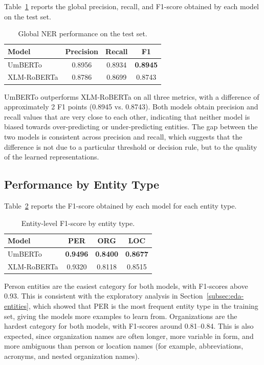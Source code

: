 Table~\ref{tab:eval-global} reports the global precision, recall, and F1-score obtained by each model on the test set.

\begin{table}[H]
    \centering
    \caption{Global NER performance on the test set.}
    \label{tab:eval-global}
    \begin{tabular}{lccc}
        \hline
        \textbf{Model} & \textbf{Precision} & \textbf{Recall} & \textbf{F1} \\
        \hline
        UmBERTo & 0.8956 & 0.8934 & \textbf{0.8945} \\
        XLM-RoBERTa & 0.8786 & 0.8699 & 0.8743 \\
        \hline
    \end{tabular}
\end{table}

UmBERTo outperforms XLM-RoBERTa on all three metrics, with a difference of approximately 2 F1 points (0.8945 vs. 0.8743). Both models obtain precision and recall values that are very close to each other, indicating that neither model is biased towards over-predicting or under-predicting entities. The gap between the two models is consistent across precision and recall, which suggests that the difference is not due to a particular threshold or decision rule, but to the quality of the learned representations.

\subsection{Performance by Entity Type}
\label{subsec:eval-entity}

Table~\ref{tab:eval-entity} reports the F1-score obtained by each model for each entity type.

\begin{table}[H]
    \centering
    \caption{Entity-level F1-score by entity type.}
    \label{tab:eval-entity}
    \begin{tabular}{lccc}
        \hline
        \textbf{Model} & \textbf{PER} & \textbf{ORG} & \textbf{LOC} \\
        \hline
        UmBERTo & \textbf{0.9496} & \textbf{0.8400} & \textbf{0.8677} \\
        XLM-RoBERTa & 0.9320 & 0.8118 & 0.8515 \\
        \hline
    \end{tabular}
\end{table}

Person entities are the easiest category for both models, with F1-scores above 0.93. This is consistent with the exploratory analysis in Section~\ref{subsec:eda-entities}, which showed that PER is the most frequent entity type in the training set, giving the models more examples to learn from. Organizations are the hardest category for both models, with F1-scores around 0.81--0.84. This is also expected, since organization names are often longer, more variable in form, and more ambiguous than person or location names (for example, abbreviations, acronyms, and nested organization names).


